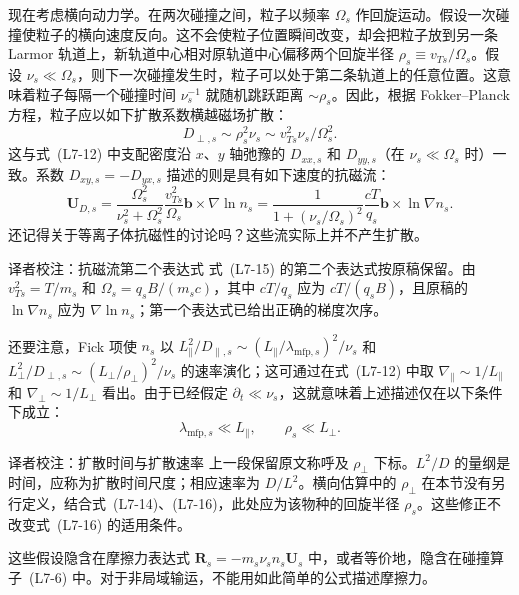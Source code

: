 现在考虑横向动力学。在两次碰撞之间，粒子以频率 $\Omega_s$ 作回旋运动。假设一次碰撞使粒子的横向速度反向。这不会使粒子位置瞬间改变，却会把粒子放到另一条 Larmor 轨道上，新轨道中心相对原轨道中心偏移两个回旋半径 $\rho_s\equiv v_{Ts}/\Omega_s$。假设 $\nu_s\ll\Omega_s$，则下一次碰撞发生时，粒子可以处于第二条轨道上的任意位置。这意味着粒子每隔一个碰撞时间 $\nu_s^{-1}$ 就随机跳跃距离 $\sim\rho_s$。因此，根据 Fokker--Planck 方程，粒子应以如下扩散系数横越磁场扩散：
\begin{equation}
D_{\perp,s}\sim\rho_s^2\nu_s\sim v_{Ts}^{2}\nu_s/\Omega_s^2.
\tag{L7-14}\label{eq:L7:14}
\end{equation}
这与式~(L7-12) 中支配密度沿 $x$、$y$ 轴弛豫的 $D_{xx,s}$ 和 $D_{yy,s}$（在 $\nu_s\ll\Omega_s$ 时）一致。系数 $D_{xy,s}=-D_{yx,s}$ 描述的则是具有如下速度的抗磁流：
\begin{equation}
\boldsymbol U_{D,s}
=\frac{\Omega_s^2}{\nu_s^2+\Omega_s^2}\frac{v_{Ts}^{2}}{\Omega_s}\boldsymbol b\times\nabla\ln n_s
=\frac1{1+(\nu_s/\Omega_s)^2}\frac{cT}{q_s}\boldsymbol b\times\ln\nabla n_s.
\tag{L7-15}\label{eq:L7:15}
\end{equation}
还记得关于等离子体抗磁性的讨论吗？这些流实际上并不产生扩散。
\begin{correction}{译者校注：抗磁流第二个表达式}
式~(L7-15) 的第二个表达式按原稿保留。由 $v_{Ts}^{2}=T/m_s$ 和 $\Omega_s=q_sB/(m_sc)$，其中 $cT/q_s$ 应为 $cT/(q_sB)$，且原稿的 $\ln\nabla n_s$ 应为 $\nabla\ln n_s$；第一个表达式已给出正确的梯度次序。
\end{correction}
还要注意，Fick 项使 $n_s$ 以 $L_\parallel^2/D_{\parallel,s}\sim(L_\parallel/\lambda_{\mathrm{mfp},s})^2/\nu_s$ 和 $L_\perp^2/D_{\perp,s}\sim(L_\perp/\rho_\perp)^2/\nu_s$ 的速率演化；这可通过在式~(L7-12) 中取 $\nabla_\parallel\sim1/L_\parallel$ 和 $\nabla_\perp\sim1/L_\perp$ 看出。由于已经假定 $\partial_t\ll\nu_s$，这就意味着上述描述仅在以下条件下成立：
\begin{equation}
\lambda_{\mathrm{mfp},s}\ll L_\parallel,\qquad \rho_s\ll L_\perp.
\tag{L7-16}\label{eq:L7:16}
\end{equation}
\begin{correction}{译者校注：扩散时间与扩散速率}
上一段保留原文称呼及 $\rho_\perp$ 下标。$L^2/D$ 的量纲是时间，应称为扩散时间尺度；相应速率为 $D/L^2$。横向估算中的 $\rho_\perp$ 在本节没有另行定义，结合式~(L7-14)、(L7-16)，此处应为该物种的回旋半径 $\rho_s$。这些修正不改变式~(L7-16) 的适用条件。
\end{correction}
这些假设隐含在摩擦力表达式 $\boldsymbol R_s=-m_s\nu_sn_s\boldsymbol U_s$ 中，或者等价地，隐含在碰撞算子~(L7-6) 中。对于非局域输运，不能用如此简单的公式描述摩擦力。

